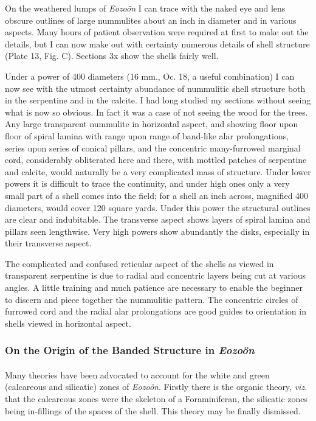 \documentclass[a4paper, 12pt, oneside]{article}
\begin{document}
On the weathered lumps of \emph{Eozoön} I can trace with the naked eye and lens obscure outlines of large nummulites about an inch in diameter and in various aspects. Many hours of patient observation were required at first to make out the details, but I can now make out with certainty numerous details of shell structure (Plate 13, Fig. C). Sections 3x show the shells fairly well.

Under a power of 400 diameters (16 mm., Oc. 18, a useful combination) I can now see with the utmost certainty abundance of nummulitic shell structure both in the serpentine and in the calcite. I had long studied my sections without seeing what is now so obvious. In fact it was a case of not seeing the wood for the trees. Any large transparent nummulite in horizontal aspect, and showing floor upon floor of spiral lamina with range upon range of band-like alar prolongations, series upon series of conical pillars, and the concentric many-furrowed marginal cord, considerably obliterated here and there, with mottled patches of serpentine and calcite, would naturally be a very complicated mass of structure. Under lower powers it is difficult to trace the continuity, and under high ones only a very small part of a shell comes into the field; for a shell an inch across, magnified 400 diameters, would cover 120 square yards. Under this power the structural outlines are clear and indubitable. The transverse aspect shows layers of spiral lamina and pillars seen lengthwise. Very high powers show abundantly the disks, especially in their transverse aspect.

The complicated and confused reticular aspect of the shells as viewed in transparent serpentine is due to radial and concentric layers being cut at various angles. A little training and much patience are necessary to enable the beginner to discern and piece together the nummulitic pattern. The concentric circles of furrowed cord and the radial alar prolongations are good guides to orientation in shells viewed in horizontal aspect.

\subsubsection{On the Origin of the Banded Structure in \emph{Eozoön}}
\paragraph{}
Many theories have been advocated to account for the white and green (calcareous and silicatic) zones of \emph{Eozoön}. Firstly there is the organic theory, \emph{viz.} that the calcareous zones were the skeleton of a Foraminiferan, the silicatic zones being in-fillings of the spaces of the shell. This theory may be finally dismissed.
\end{document}
